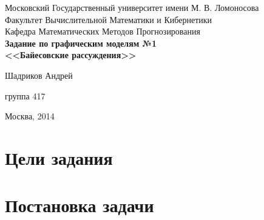 \documentclass[12pt,a4paper]{article}
\begin{document}
\begin{titlepage}
\begin{center}
  Московский Государственный университет имени М. В. Ломоносова\\
  Факультет Вычислительной Математики и Кибернетики\\
  Кафедра Математических Методов Прогнозирования\\[30mm]

  \Large\bfseries
    Задание по графическим моделям №1\\[5mm]
    <<Байесовские рассуждения>>
  \\[40mm]
\end{center}
\begin{flushright}
  Шадриков Андрей

  группа 417
\end{flushright}
\center\vspace{\fill} 
  Москва, 2014
\end{titlepage}

\tableofcontents
\newpage

\section{Цели задания}

\section{Постановка задачи}
\end{document}

